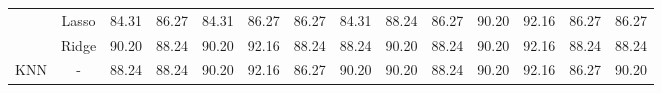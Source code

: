 \begin{landscape}
\begin{table}[]
{\begin{tabular}{cc|cccccccccccc}
				& Lasso                                 & 84.31                                                             & 86.27                                                                & 84.31                                                                & 86.27                                                               & 86.27                                                            & \multicolumn{1}{c|}{84.31}                                                                   & 88.24                                                             & 86.27                                                                & 90.20                                                                & 92.16                                                               & 86.27                                                            & 86.27                                                                   \\ 
				& Ridge                                 & 90.20                                                             & 88.24                                                                & 90.20                                                                & 92.16                                                               & 88.24                                                            & \multicolumn{1}{c|}{88.24}                                                                   & 90.20                                                             & 88.24                                                                & 90.20                                                                & 92.16                                                               & 88.24                                                            & 88.24                                                                   \\ \hline
				KNN                             & -                                     & 88.24                                                             & 88.24                                                                & 90.20                                                                & 92.16                                                               & 86.27                                                            & \multicolumn{1}{c|}{90.20}                                                                   & 90.20                                                             & 88.24                                                                & 90.20                                                                & 92.16                                                               & 86.27                                                            & 90.20                                                                   \\ \hline

\end{tabular}}
\end{table}
\end{landscape}
